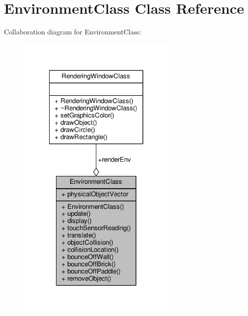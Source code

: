 \hypertarget{classEnvironmentClass}{\section{Environment\-Class Class Reference}
\label{classEnvironmentClass}
}


Collaboration diagram for Environment\-Class\-:\nopagebreak
\begin{figure}[H]
\begin{center}
\leavevmode
\includegraphics[width=222pt]{classEnvironmentClass__coll__graph}
\end{center}
\end{figure}
